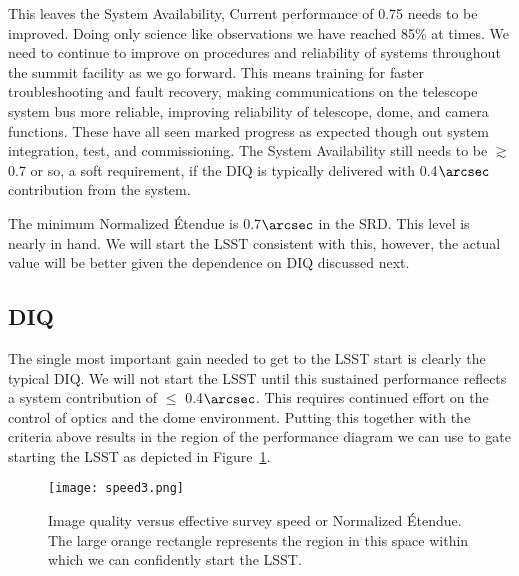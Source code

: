 This leaves the System Availability, Current performance of 0.75 needs to be improved. Doing only science like observations we have reached 85$\%$ at times. We need to continue to improve on procedures and reliability of systems throughout the summit facility as we go forward. This means training for faster troubleshooting and fault recovery, making communications on the telescope system bus more reliable, improving reliability of telescope, dome, and camera functions. These have all seen marked progress as expected though out system integration, test, and commissioning. The System Availability still needs to be $\gtrsim$ 0.7 or so, a soft requirement, if the DIQ is typically delivered with 0.4$\arcsec$ contribution from the system. 

The minimum Normalized \'{E}tendue is 0.7$\arcsec$ in the SRD. This level is nearly in hand. We will start the LSST consistent with this, however, the actual value will be better given the dependence on DIQ discussed next. 

\subsection{DIQ}

The single most important gain needed to get to the LSST start is clearly the typical DIQ. We will not start the LSST until this sustained performance reflects a system contribution of $\le$ 0.4$\arcsec$. This requires continued effort on the control of optics and the dome environment. Putting this together with the criteria above results in the region of the performance diagram we can use to gate starting the LSST as depicted in Figure~\ref{speed3}. 

\begin{figure}[t]
  \centering
\texttt{[image: speed3.png]}
\caption{Image quality versus effective survey speed or Normalized \'{E}tendue. The large orange rectangle represents the region in this space within which we can confidently start the LSST.}
\label{speed3}
\end{figure}

\newpage
